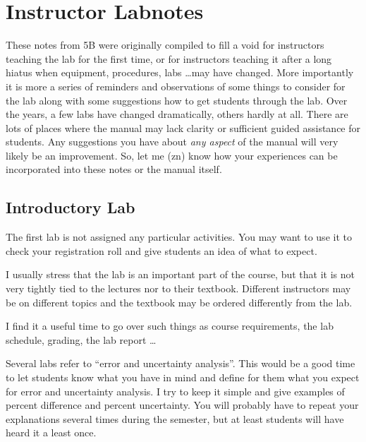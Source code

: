 
\chapter{Instructor Labnotes}
These notes from 5B were originally compiled to fill a void for instructors teaching the lab for the first time, or for instructors teaching it after a long hiatus when equipment, procedures, labs \dots may have changed. More importantly it is more a series of reminders and observations of some things to consider for the lab along with some suggestions how to get students through the lab. Over the years, a few labs have changed dramatically, others hardly at all. There are lots of places where the manual may lack clarity or sufficient guided assistance for students. Any suggestions you have about \emph{any aspect} of the manual will very likely be an improvement. So, let me (zn) know how your experiences can be incorporated into these notes or the manual itself.
\section*{Introductory Lab}
The first lab is not assigned any particular activities. You may want to use it to check your registration roll and give students an idea of what to expect.

I usually stress that the lab is an important part of the course, but that it is not very tightly tied to the lectures nor to their textbook. Different instructors may be on different topics and the textbook may be ordered differently from the lab.

I find it a useful time to go over such things as course requirements, the lab schedule, grading, the lab report \ldots

Several labs refer to ``error and uncertainty analysis''. This would be a good time to let students know what you have in mind and define for them what you expect for error and uncertainty analysis. I try to keep it simple and give examples of percent difference and percent uncertainty. You will probably have to repeat your explanations several times during the semester, but at least students will have heard it a least once.

